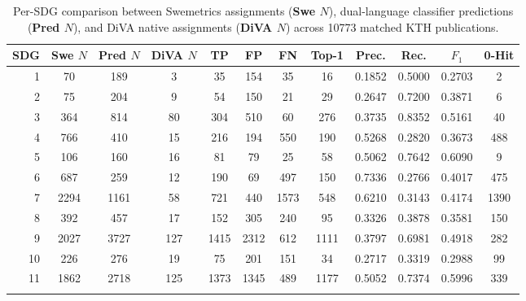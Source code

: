 \begin{table}[htbp]
  \centering
  \small
  \caption{Per-\gls{SDG} comparison between Swemetrics assignments (\textbf{Swe $N$}), dual-language classifier predictions (\textbf{Pred $N$}), and \gls{DiVA} native assignments (\textbf{DiVA $N$}) across \num{10773} matched \gls{KTH} publications.}
  \label{tab:swemetrics_per_sdgPostRefinement}
  \begingroup
  \begin{tabular}{r S[table-format=5.0] S[table-format=5.0] S[table-format=3.0] *{4}{S[table-format=4.0]} *{3}{S[table-format=1.4]} S[table-format=4.0]}
    \toprule
    \textbf{SDG} & {\textbf{Swe $N$}} & {\textbf{Pred $N$}} & {\textbf{DiVA $N$}} & {\textbf{TP}} & {\textbf{FP}} & {\textbf{FN}} & {\textbf{Top-1}} & {\textbf{Prec.}} & {\textbf{Rec.}} & {\textbf{$F_1$}} & {\textbf{0-Hit}} \\
     &   70 &   189 &    3 &    35 &   154 &    35 &    16 &  0.1852 &  0.5000 &  0.2703 &     2\\
     2 &   75 &   204 &    9 &    54 &   150 &    21 &    29 &  0.2647 &  0.7200 &  0.3871 &     6\\
     3 &  364 &   814 &   80 &   304 &   510 &    60 &   276 &  0.3735 &  0.8352 &  0.5161 &    40\\
     4 &  766 &   410 &   15 &   216 &   194 &   550 &   190 &  0.5268 &  0.2820 &  0.3673 &   488\\
     5 &  106 &   160 &   16 &    81 &    79 &    25 &    58 &  0.5062 &  0.7642 &  0.6090 &     9\\
     6 &  687 &   259 &   12 &   190 &    69 &   497 &   150 &  0.7336 &  0.2766 &  0.4017 &   475\\
     7 & 2294 &  1161 &   58 &   721 &   440 &  1573 &   548 &  0.6210 &  0.3143 &  0.4174 &  1390\\
     8 &  392 &   457 &   17 &   152 &   305 &   240 &    95 &  0.3326 &  0.3878 &  0.3581 &   150\\
     9 & 2027 &  3727 &  127 &  1415 &  2312 &   612 &  1111 &  0.3797 &  0.6981 &  0.4918 &   282\\
    10 &  226 &   276 &   19 &    75 &   201 &   151 &    34 &  0.2717 &  0.3319 &  0.2988 &    99\\
    11 & 1862 &  2718 &  125 &  1373 &  1345 &   489 &  1177 &  0.5052 &  0.7374 &  0.5996 &   339\\

\end{tabular}
\end{table}
